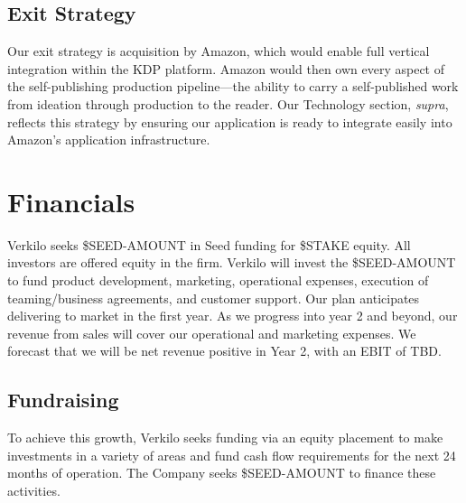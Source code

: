 \documentclass[10pt,openany]{book}
\begin{document}
\hypertarget{exit-strategy}{%
\section{Exit Strategy}\label{exit-strategy}}

Our exit strategy is acquisition by Amazon, which would enable full
vertical integration within the KDP platform. Amazon would then own
every aspect of the self-publishing production pipeline---the ability to
carry a self-published work from ideation through production to the
reader. Our Technology section, \emph{supra}, reflects this strategy by
ensuring our application is ready to integrate easily into Amazon's
application infrastructure.

\hypertarget{financials}{%
\chapter{Financials}\label{financials}}

Verkilo seeks \$SEED-AMOUNT in Seed funding for \$STAKE equity. All
investors are offered equity in the firm. Verkilo will invest the
\$SEED-AMOUNT to fund product development, marketing, operational
expenses, execution of teaming/business agreements, and customer
support. Our plan anticipates delivering to market in the first year. As
we progress into year 2 and beyond, our revenue from sales will cover
our operational and marketing expenses. We forecast that we will be net
revenue positive in Year 2, with an EBIT of TBD.

\hypertarget{fundraising}{%
\section{Fundraising}\label{fundraising}}

To achieve this growth, Verkilo seeks funding via an equity placement to
make investments in a variety of areas and fund cash flow requirements
for the next 24 months of operation. The Company seeks \$SEED-AMOUNT to
finance these activities.
\end{document}
